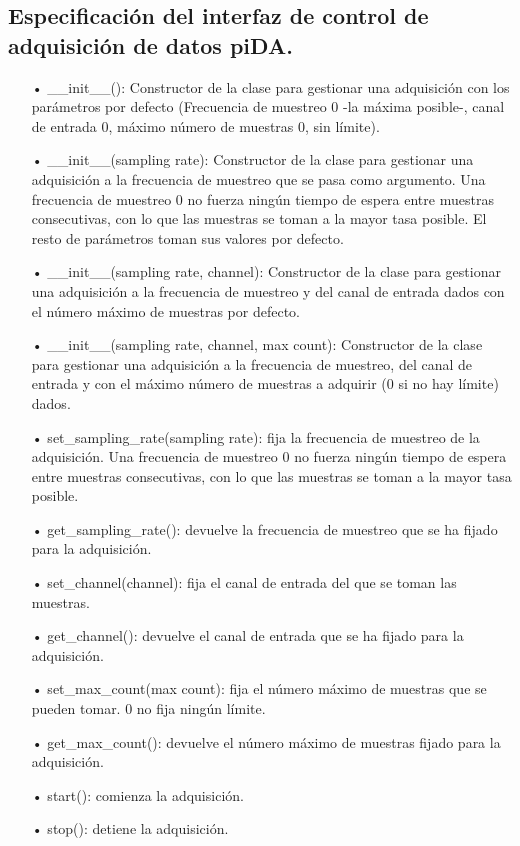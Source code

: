 	\subsection{Especificación del interfaz de control de adquisición de datos piDA.}\label{subsec:especificacion_piDA}
	\begin{itemize}
		\item[•] \_\_init\_\_(): Constructor de la clase para gestionar una adquisición con los parámetros por defecto (Frecuencia de muestreo 0 -la máxima posible-, canal de entrada 0, máximo número de muestras 0, sin límite).
		\item[•] \_\_init\_\_(sampling rate): Constructor de la clase para gestionar una adquisición a la frecuencia de muestreo que se pasa como argumento. Una frecuencia de muestreo 0 no fuerza ningún tiempo de espera entre muestras consecutivas, con lo que las muestras se toman a la mayor tasa posible. El resto de parámetros toman sus valores por defecto.
		\item[•] \_\_init\_\_(sampling rate, channel): Constructor de la clase para gestionar una adquisición a la frecuencia de muestreo y del canal de entrada dados con el número máximo de muestras por defecto.
		\item[•] \_\_init\_\_(sampling rate, channel, max count): Constructor de la clase para gestionar una adquisición a la frecuencia de muestreo, del canal de entrada y con el máximo número de muestras a adquirir (0 si no hay límite) dados.
		\item[•] set\_sampling\_rate(sampling rate): fija la frecuencia de muestreo de la adquisición. Una frecuencia de muestreo 0 no fuerza ningún tiempo de espera entre muestras consecutivas, con lo que las muestras se toman a la mayor tasa posible.
		\item[•] get\_sampling\_rate(): devuelve la frecuencia de muestreo que se ha fijado para la adquisición.
		\item[•] set\_channel(channel): fija el canal de entrada del que se toman las muestras.
		\item[•] get\_channel(): devuelve el canal de entrada que se ha fijado para la adquisición.
		\item[•] set\_max\_count(max count): fija el número máximo de muestras que se pueden tomar. 0 no fija ningún límite.
		\item[•] get\_max\_count(): devuelve el número máximo de muestras fijado para la adquisición.
		\item[•] start(): comienza la adquisición.
		\item[•] stop(): detiene la adquisición.

\end{itemize}
